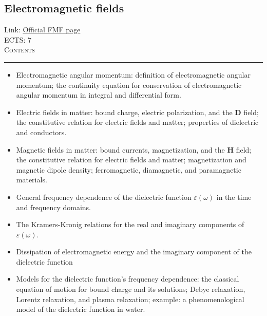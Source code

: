 \documentclass[11pt, a4paper]{article}
\newenvironment{course}[3]{
\subsection{#1}%
Link: \href{#2}{Official FMF page}\\%
ECTS: #3%
\vspace{1ex}
\\
{\large \textsc{Contents}}\\[-0.9ex]%
\rule{\textwidth}{0.5pt}
\vspace{-3ex}
}
{}
\newenvironment{chapter}[1]{
\begin{tcolorbox}[title=#1, breakable]
}
{\end{tcolorbox}}
\begin{document}
\begin{course}{Electromagnetic fields}{https://www.fmf.uni-lj.si/en/study-physics/programmes/1fiz/2020/7000777/courses/1133/}{7}
\begin{chapter}{Maxwell's equations in free space}
\begin{itemize}
            \item Electromagnetic angular momentum: definition of electromagnetic angular momentum; the continuity equation for conservation of electromagnetic angular momentum in integral and differential form.

        \end{itemize}
    \end{chapter}

    \begin{chapter}{Electromagnetic fields in matter}
        \begin{itemize}
        
            \item Electric fields in matter: bound charge, electric polarization, and the $ \bm{D} $ field; the constitutive relation for electric fields and matter; properties of dielectric and conductors.

            \item Magnetic fields in matter: bound currents, magnetization, and the $ \bm{H} $ field; the constitutive relation for electric fields and matter; magnetization and magnetic dipole density; ferromagnetic, diamagnetic, and paramagnetic materials.
        
        \end{itemize}
    \end{chapter}

    \begin{chapter}{Frequency dependence of the dielectric function}

        \begin{itemize}
        
            \item General frequency dependence of the dielectric function $ \varepsilon(\omega) $ in the time and frequency domains.

            \item The Kramers-Kronig relations for the real and imaginary components of $ \varepsilon(\omega) $.

            \item Dissipation of electromagnetic energy and the imaginary component of the dielectric function

            \item Models for the dielectric function's frequency dependence: the classical equation of motion for bound charge and its solutions; Debye relaxation, Lorentz relaxation, and plasma relaxation; example: a phenomenological model of the dielectric function in water.
        

\end{itemize}
\end{chapter}
\end{course}
\end{document}
